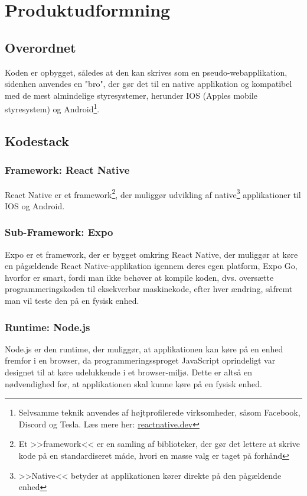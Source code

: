 \section{Produktudformning}
\subsection{Overordnet}
Koden er opbygget, således at den kan skrives som en pseudo-webapplikation, sidenhen anvendes en "bro", der gør det til en native applikation og kompatibel med de mest almindelige styresystemer, herunder IOS (Apples mobile styresystem) og Android\footnote{Selvsamme teknik anvendes af højtprofilerede virksomheder, såsom Facebook, Discord og Tesla. Læs mere her: \href{https://reactnative.dev/}{reactnative.dev}}.

\subsection{Kodestack}
\subsubsection{Framework: React Native \label{sec:reactnative}}
React Native er et framework\footnote{Et >>framework<< er en samling af biblioteker, der gør det lettere at skrive kode på en standardiseret måde, hvori en masse valg er taget på forhånd}, der muliggør udvikling af native\footnote{>>Native<< betyder at applikationen kører direkte på den pågældende enhed} applikationer til IOS og Android. 
\subsubsection{Sub-Framework: Expo}
Expo er et framework, der er bygget omkring React Native, der muliggør at køre en pågældende React Native-applikation igennem deres egen platform, Expo Go, hvorfor er smart, fordi man ikke behøver at kompile koden, dvs. oversætte programmeringskoden til eksekverbar maskinekode, efter hver ændring, såfremt man vil teste den på en fysisk enhed. 
\subsubsection{Runtime: Node.js}
Node.js er den runtime, der muliggør, at applikationen kan køre på en enhed fremfor i en browser, da programmeringssproget JavaScript oprindeligt var designet til at køre udelukkende i et browser-miljø. Dette er altså en nødvendighed for, at applikationen skal kunne køre på en fysisk enhed.
